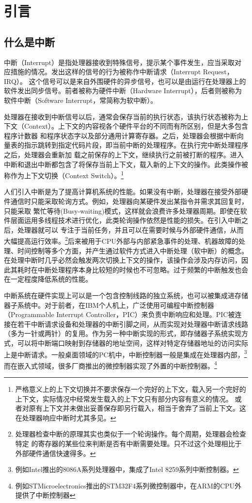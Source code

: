 
\chapter{引言}

\section{什么是中断}
中断（Interrupt）是指处理器接收到特殊信号，提示某个事件发生，应当采取对应措施的情况。发出这样的信号的行为被称作中断请求（Interrupt Request，IRQ）。
这个信号可以是来自外围硬件的异步信号，也可以是由运行在处理器上的软件发出同步信号。前者被称为硬件中断（Hardware Interrupt），后者则被称为软件中断（Software Interrupt，常简称为软中断）。

处理器在接收到中断信号以后，通常会保存当前的执行状态，该执行状态被称为上下文（Context）。上下文的内容视各个硬件平台的不同而有所区别，但是大多包含程序计数器
和程序状态字以及部分通用计算寄存器。之后，处理器会根据中断向量表的指示跳转到指定代码片段，即当前中断的处理程序。在执行完中断处理程序之后，处理器会重新加
载之前保存的上下文，继续执行之前被打断的程序。进入中断和退出中断都包含了将保存当前上下文，载入新的上下文的操作。此类操作被称作为上下文切换（Context Switch）。\footnote{严格意义上的上下文切换并不要求保存一个完好的上下文，载入另一个完好的上下文，实际情况中经常发生载入的上下文只有部分内容有意义的情况。
或者对原有上下文并未做出妥善保存即另行载入，相当于舍弃了当前上下文。这在处理器响应中断时尤其多见。}

人们引入中断是为了提高计算机系统的性能。如果没有中断，处理器在接受外部硬件通信时只能采取轮询方式。例如，处理器向某硬件发出某指令并需求其回复时，只能采取
繁忙等待(Busy-waiting)模式，这样就会浪费许多处理器周期。即使在软件层面运用多线程技术进行优化，此类轮询操作依然是性能的损失。在引入中断之后，处理器就可以
专注于当前任务，并且可以在需要时候与外部硬件通信，从而大幅提高运行效率。\footnote{处理器检查中断的原理其实也类似于一个轮询操作。每个周期，处理器会检查特定
的寄存器的某些位来判断是否有中断需要处理。只不过这个处理相比于外部硬件通信快速得多。}后来被用于CPU外部与内部紧急事件的处理、机器故障的处理、时间控制等多个方面，并产生通过软件方式进入中断处理（软中断）的概念。在处理中断时几乎必然会触发两次切换上下文的操作，该操作会涉及内存访问，因此其耗时在中断处理程序本身比较短的时候也不可忽略。过于频繁的中断触发也会在一定程度降低系统的性能。

中断系统在硬件实现上可以是一个包含控制线路的独立系统，也可以被集成进存储器子系统中。对于前者，在IBM个人机上，广泛使用可编程中断控制器（Programmable Interrupt Controller，PIC）来负责中断响应和处理。PIC被连接在若干中断请求设备和处理器的中断引脚之间，从而实现对处理器中断请求线路（多为一针或两针）的复用。作为另一种中断实现的形式，即存储器子系统实现方式，可以将中断端口映射到存储器的地址空间，这样对特定存储器地址的访问实际上是中断请求。一般桌面领域的PC机中，中断控制器一般是集成在处理器内部，\footnote{例如Intel推出的8086A系列处理器中，集成了Intel 8259系列中断控制器。}而在嵌入式领域，很多厂商推出的微控制器实现了外置的中断控制器。\footnote{例如STMicroelectronics推出的STM32F4系列微控制器中，在ARM的CPU外提供了中断控制器}

